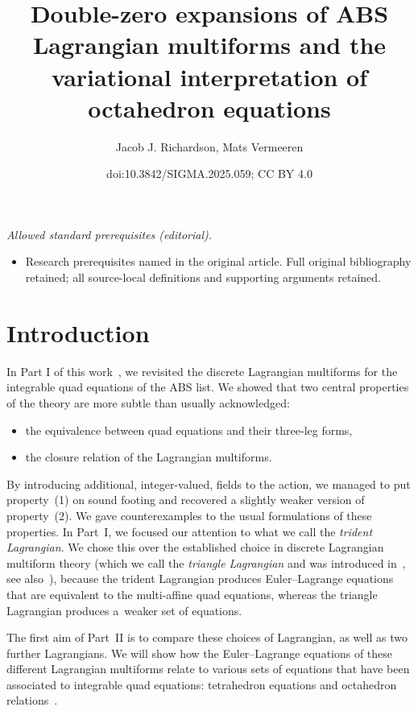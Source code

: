 \documentclass[10pt,a4paper]{amsart}
\title{Double-zero expansions of ABS Lagrangian multiforms and the variational interpretation of octahedron equations}
\author{Jacob J. Richardson, Mats Vermeeren}
\date{doi:10.3842/SIGMA.2025.059; CC BY 4.0}
\numberwithin{equation}{section}
\begin{document}
\maketitle
\noindent\textit{Allowed standard prerequisites (editorial).}\begin{itemize}
\item Research prerequisites named in the original article. Full original bibliography retained; all source-local definitions and supporting arguments retained.
\end{itemize}\medskip
\section{Introduction}

In Part I of this work~\cite{richardson2025discrete1}, we revisited the discrete Lagrangian multiforms for the integrable quad equations of the ABS list. We showed that two central properties of the theory are more subtle than usually acknowledged:
\begin{itemize}	\itemsep=0pt
 \item[(1)] the equivalence between quad equations and their three-leg forms,
 \item[(2)] the closure relation of the Lagrangian multiforms.
\end{itemize}
By introducing additional, integer-valued, fields to the action, we managed to put property~(1) on sound footing and recovered a slightly weaker version of property~(2). We gave counterexamples to the usual formulations of these properties.
In Part~I, we focused our attention to what we call the \emph{trident Lagrangian}. We chose this over the established choice in discrete Lagrangian multiform theory (which we call the \emph{triangle Lagrangian} and was introduced in~\cite{lobb2009lagrangian}, see also~\mbox{\cite{bobenko2010lagrangian, boll2014integrability, boll2016integrability, lobb2018variational, xenitidis2011lagrangian}}), because the trident Lagrangian produces Euler--Lagrange equations that are equivalent to the multi-affine quad equations, whereas the triangle Lagrangian produces a~weaker set of equations.

The first aim of Part~II is to compare these choices of Lagrangian, as well as two further Lagrangians. We will show how the Euler--Lagrange equations of these different Lagrangian multiforms relate to various sets of equations that have been associated to integrable quad equations: tetrahedron equations and octahedron relations~\cite{boll2014integrability, boll2016integrability}.
\end{document}

